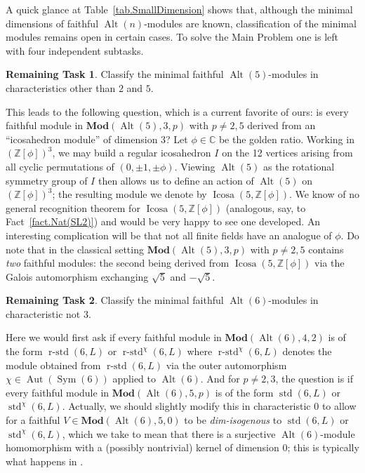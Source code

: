 \documentclass[a4paper, 11pt]{amsart}
\theoremstyle{plain}
\theoremstyle{definition}
\newtheorem{task}{Remaining Task}
\theoremstyle{remark}
\DeclareMathOperator{\Aut}{Aut}
\DeclareMathOperator{\Sym}{Sym}
\DeclareMathOperator{\Alt}{Alt}
\DeclareMathOperator{\std}{std}
\DeclareMathOperator{\rstd}{r-std}
\DeclareMathOperator{\icosa}{Icosa}
\newcommand{\Mod}{\mathbf{Mod}}
\newcommand{\bZ}{\mathbb{Z}}
\begin{document}
A quick glance at Table~\ref{tab.SmallDimension} %
shows that, although the minimal dimensions of faithful $\Alt(n)$-modules are known, classification of the minimal modules %
remains open in certain cases. To solve the Main Problem one is left with four independent subtasks.

\begin{task}\label{p.Alt(5)}
Classify the minimal faithful $\Alt(5)$-modules in characteristics other than $2$ and $5$. 
\end{task}

This leads to the following question, which is a current favorite of ours: 
is every faithful module in $\Mod(\Alt(5),3,p)$ with $p\neq2,5$ derived from an ``icosahedron module'' of dimension $3$?
Let $\phi \in \mathbb{C}$ be the golden ratio.
Working in $(\bZ[\phi])^3$, we may build a regular icosahedron $I$ on the 12 vertices arising from all cyclic permutations of $(0,\pm1,\pm\phi)$. Viewing $\Alt(5)$ as the rotational symmetry group of $I$ then allows us to define an action of $\Alt(5)$ on $(\bZ[\phi])^3$; the resulting module we denote by $\icosa(5,\bZ[\phi])$.  We know of no general recognition theorem for $\icosa(5,\bZ[\phi])$ (analogous, say, to Fact~\ref{fact.Nat(SL2)}) and would be very happy to see one developed.
An interesting complication will be that not all finite fields have an analogue of $\phi$.
Do note that in the classical setting $\Mod(\Alt(5),3,p)$ with $p\neq2,5$ contains \emph{two} faithful modules: the second being derived from $\icosa(5,\bZ[\phi])$ via the Galois automorphism exchanging $\sqrt{5}$ and $-\sqrt{5}$.


\begin{task}\label{p.Alt(6)}
Classify the minimal faithful $\Alt(6)$-modules in characteristic not $3$.
\end{task}

Here we would first ask if every faithful module in $\Mod(\Alt(6),4,2)$ is of the form $\rstd(6,L)$ or $\rstd^\chi(6,L)$ where $\rstd^\chi(6,L)$ denotes the module obtained from $\rstd(6,L)$ via the outer automorphism $\chi\in \Aut(\Sym(6))$ applied to $\Alt(6)$. And for $p\neq2,3$, the question is if every faithful module in $\Mod(\Alt(6),5,p)$ is of the form $\std(6,L)$ or $\std^\chi(6,L)$. Actually, we should slightly modify this in characteristic $0$ to allow for a faithful $V\in \Mod(\Alt(6),5,0)$ to be \emph{dim-isogenous} to $\std(6,L)$ or $\std^\chi(6,L)$, which we take to mean that there is a surjective $\Alt(6)$-module homomorphism with a (possibly nontrivial) kernel of dimension $0$; this is typically what happens in \cite[Theorem]{CDW23}.
\end{document}
